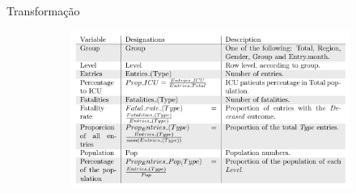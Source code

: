 \documentclass[pdf]
{beamer}
\begin{document}
\begin{frame}{Transformação}
\begin{figure}[!ht]
\begin{subfigure}{0.38\textwidth}
    \vspace{0.4cm}
    \includegraphics[width=\textwidth]{Imagens/Dados_Transf_Perc.png}\\
\end{subfigure}
\end{figure}

\end{frame}
\end{document}
